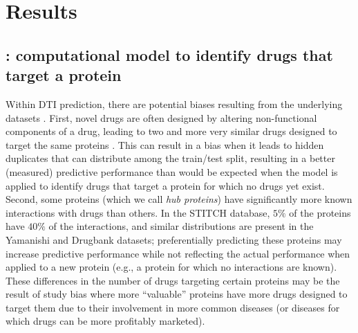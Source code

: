 \documentclass{bioinfo}
\renewcommand{\cite}{\citep}
\begin{document}
\section{Results}

\subsection{\name: computational model to identify drugs that target a
  protein}


Within DTI prediction, there are potential biases resulting from the
underlying datasets \citep{Pahikkala2014}. First, novel drugs are
often designed by altering non-functional components of a drug,
leading to two and more very similar drugs designed to target the same
proteins \cite{Overington2006}. This can result in a bias when it
leads to hidden duplicates that can distribute among the train/test
split, resulting in a better (measured) predictive performance than
would be expected when the model is applied to identify drugs that
target a protein for which no drugs yet exist. Second, some proteins
(which we call \textit{hub proteins}) have significantly more known
interactions with drugs than others. In the STITCH database, $5\%$ of
the proteins have $40\%$ of the interactions, and similar
distributions are present in the Yamanishi and Drugbank
\cite{Drugbank2007, Drugbank2017} datasets; preferentially predicting
these proteins may increase predictive performance while not
reflecting the actual performance when applied to a new protein (e.g.,
a protein for which no interactions are known). These differences in
the number of drugs targeting certain proteins may be the result of
study bias where more ``valuable'' proteins have more drugs designed
to target them due to their involvement in more common diseases (or
diseases for which drugs can be more profitably marketed).
\end{document}
